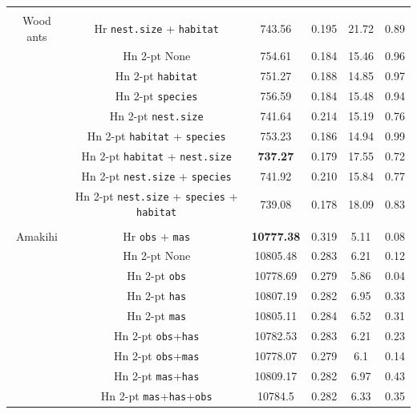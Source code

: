 \documentclass[useAMS,referee,usenatbib]{biom}
\begin{document}
\begin{table}
\begin{tabular}{c c c c c c}
 &&&&&\\
Wood ants & Hr \texttt{nest.size} + \texttt{habitat} & 743.56 & 0.195  & 21.72 & 0.89\\ %
 & Hn 2-pt  None  &  754.61  &  0.184  &  15.46  &  0.96 \\
 & Hn 2-pt \texttt{habitat} &  751.27  &  0.188  &  14.85  &  0.97 \\
 & Hn 2-pt \texttt{species} &  756.59  &  0.184  &  15.48  &  0.94 \\
 & Hn 2-pt \texttt{nest.size} &  741.64  &  0.214  &  15.19  &  0.76 \\
 & Hn 2-pt \texttt{habitat} + \texttt{species} &  753.23  &  0.186  &  14.94  &  0.99 \\
 & Hn 2-pt \texttt{habitat} + \texttt{nest.size}  &  \textbf{737.27}  &  0.179  &  17.55  &  0.72 \\
 & Hn 2-pt \texttt{nest.size} + \texttt{species}   &  741.92  &  0.210  &  15.84  &  0.77 \\
 & Hn 2-pt \texttt{nest.size} + \texttt{species} + \texttt{habitat}  &  739.08  &  0.178  &  18.09  &  0.83 \\
 &&&&&\\
Amakihi  & Hr \texttt{obs} + \texttt{mas} & \textbf{10777.38} &  0.319 & 5.11 & 0.08\\ %
 & Hn 2-pt None  &  10805.48  &  0.283  &  6.21  &  0.12 \\
 & Hn 2-pt \texttt{obs}  &  10778.69  &  0.279  &  5.86  &  0.04 \\
 & Hn 2-pt \texttt{has}  &  10807.19  &  0.282  &  6.95  &  0.33 \\
 & Hn 2-pt \texttt{mas}  &  10805.11  &  0.284  &  6.52  &  0.31 \\
 & Hn 2-pt \texttt{obs}+\texttt{has}  &  10782.53  &  0.283  &  6.21  &  0.23 \\
 & Hn 2-pt \texttt{obs}+\texttt{mas}  &  10778.07  &  0.279  &  6.1  &  0.14 \\
 & Hn 2-pt \texttt{mas}+\texttt{has}  &  10809.17  &  0.282  &  6.97  &  0.43 \\
 & Hn 2-pt \texttt{mas}+\texttt{has}+\texttt{obs}  &  10784.5  &  0.282  &  6.33  &  0.35 \\
\hline
\end{tabular}
\label{williams-pike-table}
\end{table}
\end{document}
